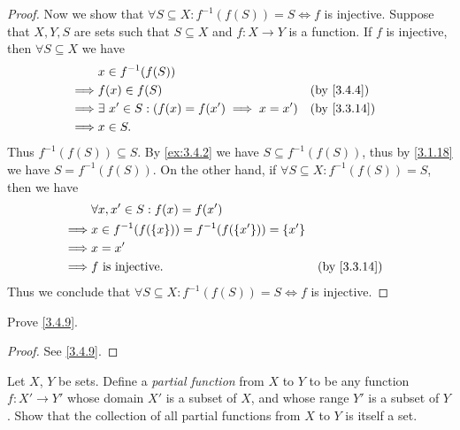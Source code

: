 \begin{proof}
  Now we show that \(\forall S \subseteq X : f^{-1}(f(S)) = S \iff f\) is injective.
  Suppose that \(X, Y, S\) are sets such that \(S \subseteq X\) and \(f : X \to Y\) is a function.
  If \(f\) is injective, then \(\forall S \subseteq X\) we have
  \begin{align*}
             & x \in f^{-1}(f(S))                                                                \\
    \implies & f(x) \in f(S)                                      &  & \text{(by \cref{3.4.4})}  \\
    \implies & \exists\ x' \in S : (f(x) = f(x') \implies x = x') &  & \text{(by \cref{3.3.14})} \\
    \implies & x \in S.
  \end{align*}
  Thus \(f^{-1}(f(S)) \subseteq S\).
  By \cref{ex:3.4.2} we have \(S \subseteq f^{-1}(f(S))\), thus by \cref{3.1.18} we have \(S = f^{-1}(f(S))\).
  On the other hand, if \(\forall S \subseteq X : f^{-1}(f(S)) = S\), then we have
  \begin{align*}
             & \forall x, x' \in S : f(x) = f(x')                                                 \\
    \implies & x \in f^{-1}(f(\{x\})) = f^{-1}(f(\{x'\})) = \{x'\}                                \\
    \implies & x = x'                                                                             \\
    \implies & f \text{ is injective}.                             &  & \text{(by \cref{3.3.14})}
  \end{align*}
  Thus we conclude that \(\forall S \subseteq X : f^{-1}(f(S)) = S \iff f\) is injective.
\end{proof}

\begin{ex}\label{ex:3.4.6}
  Prove \cref{3.4.9}.
\end{ex}

\begin{proof}
  See \cref{3.4.9}.
\end{proof}

\begin{ex}\label{ex:3.4.7}
  Let \(X\), \(Y\) be sets.
  Define a \emph{partial function} from \(X\) to \(Y\) to be any function \(f : X' \to Y'\) whose domain \(X'\) is a subset of \(X\), and whose range \(Y'\) is a subset of \(Y\).
  Show that the collection of all partial functions from \(X\) to \(Y\) is itself a set.
\end{ex}


